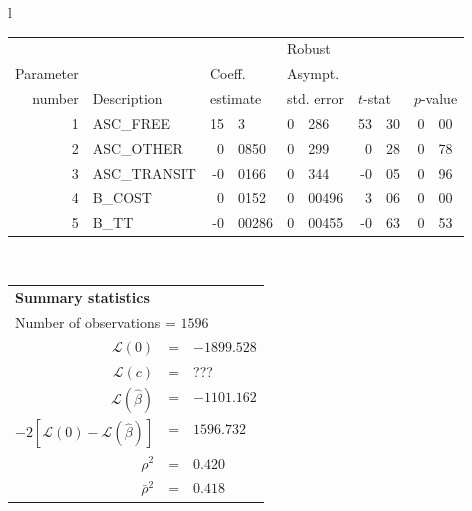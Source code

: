   \begin{tabular}{l}
\begin{tabular}{rlr@{.}lr@{.}lr@{.}lr@{.}l}
         &                       &   \multicolumn{2}{l}{}    & \multicolumn{2}{l}{Robust}  &     \multicolumn{4}{l}{}   \\
Parameter &                       &   \multicolumn{2}{l}{Coeff.}      & \multicolumn{2}{l}{Asympt.}  &     \multicolumn{4}{l}{}   \\
number &  Description                     &   \multicolumn{2}{l}{estimate}      & \multicolumn{2}{l}{std. error}  &   \multicolumn{2}{l}{$t$-stat}  &   \multicolumn{2}{l}{$p$-value}   \\

\hline

1 & ASC\_FREE & 15&3 & 0&286 & 53&30 & 0&00 \\
2 & ASC\_OTHER & 0&0850 & 0&299 & 0&28 & 0&78 \\
3 & ASC\_TRANSIT & -0&0166 & 0&344 & -0&05 & 0&96 \\
4 & B\_COST & 0&0152 & 0&00496 & 3&06 & 0&00 \\
5 & B\_TT & -0&00286 & 0&00455 & -0&63 & 0&53 \\
\hline

\end{tabular}
\\
\begin{tabular}{rcl}
\multicolumn{3}{l}{\bf Summary statistics}\\
\multicolumn{3}{l}{ Number of observations = $1596$} \\
 $\mathcal{L}(0)$ &=&  $-1899.528$ \\
 $\mathcal{L}(c)$ &=& ???\\
 $\mathcal{L}(\hat{\beta})$ &=& $-1101.162 $  \\
 $-2[\mathcal{L}(0) -\mathcal{L}(\hat{\beta})]$ &=& $1596.732$ \\
    $\rho^2$ &=&   $0.420$ \\
    $\bar{\rho}^2$ &=&    $0.418$ \\
\end{tabular}
\end{tabular}

